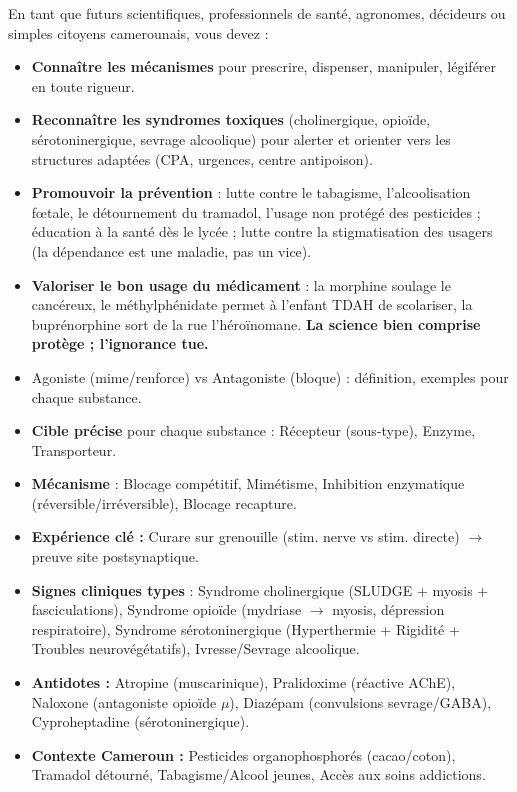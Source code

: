 \documentclass[11pt]{article}
\newcommand{\cle}[1]{{\popxbold\color{popdark}#1}}
\begin{document}
En tant que futurs scientifiques, professionnels de santé, agronomes, décideurs ou simples citoyens camerounais, vous devez :
\begin{itemize}
    \item \textbf{Connaître les mécanismes} pour prescrire, dispenser, manipuler, légiférer en toute rigueur.
    \item \textbf{Reconnaître les syndromes toxiques} (cholinergique, opioïde, sérotoninergique, sevrage alcoolique) pour alerter et orienter vers les structures adaptées (CPA, urgences, centre antipoison).
    \item \textbf{Promouvoir la prévention} : lutte contre le tabagisme, l'alcoolisation fœtale, le détournement du tramadol, l'usage non protégé des pesticides ; éducation à la santé dès le lycée ; lutte contre la stigmatisation des usagers (la dépendance est une maladie, pas un vice).
    \item \textbf{Valoriser le bon usage du médicament} : la morphine soulage le cancéreux, le méthylphénidate permet à l'enfant TDAH de scolariser, la buprénorphine sort de la rue l'héroïnomane. \textbf{La science bien comprise protège ; l'ignorance tue.}
\end{itemize}

\begin{aretenir}
\begin{itemize}
    \item \cle{Agoniste} (mime/renforce) vs \cle{Antagoniste} (bloque) : définition, exemples pour chaque substance.
    \item \textbf{Cible précise} pour chaque substance : Récepteur (sous-type), Enzyme, Transporteur.
    \item \textbf{Mécanisme} : Blocage compétitif, Mimétisme, Inhibition enzymatique (réversible/irréversible), Blocage recapture.
    \item \textbf{Expérience clé :} Curare sur grenouille (stim. nerve vs stim. directe) $\rightarrow$ preuve site postsynaptique.
    \item \textbf{Signes cliniques types} : Syndrome cholinergique (SLUDGE + myosis + fasciculations), Syndrome opioïde (mydriase $\rightarrow$ myosis, dépression respiratoire), Syndrome sérotoninergique (Hyperthermie + Rigidité + Troubles neurovégétatifs), Ivresse/Sevrage alcoolique.
    \item \textbf{Antidotes :} Atropine (muscarinique), Pralidoxime (réactive AChE), Naloxone (antagoniste opioïde $\mu$), Diazépam (convulsions sevrage/GABA), Cyproheptadine (sérotoninergique).
    \item \textbf{Contexte Cameroun :} Pesticides organophosphorés (cacao/coton), Tramadol détourné, Tabagisme/Alcool jeunes, Accès aux soins addictions.
\end{itemize}
\end{aretenir}
\end{document}
